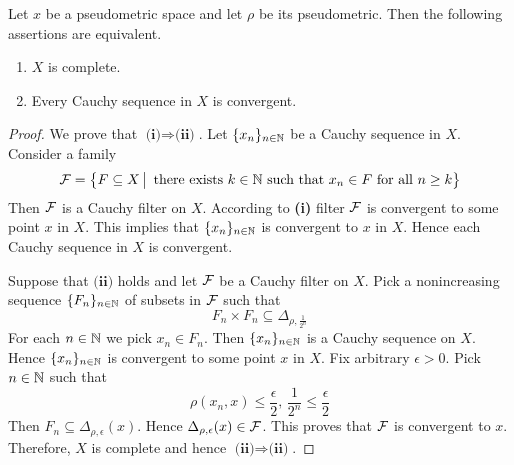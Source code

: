 \begin{theorem}\label{theorem:completeness_for_pseudometric_spaces_is_equivalent_to_convergence_of_Cauchy_sequences}
	Let $x$ be a pseudometric space and let $\rho$ be its pseudometric. Then the following assertions are equivalent.
	\begin{enumerate}[label=\emph{\textbf{(\roman*)}}, leftmargin=3.0em]
		\item $X$ is complete.
		\item Every Cauchy sequence in $X$ is convergent.
	\end{enumerate}
\end{theorem}
\begin{proof}
	We prove that $\textbf{(i)} \Rightarrow \textbf{(ii)}$. Let $\{x_n\}_{n \in {\mathbb N}}$ be a Cauchy sequence in $X$. Consider a family
	$${\mathcal F} = \big\{F\subseteq X\,\big|\,\mbox{ there exists }k\in {\mathbb N}\mbox{ such that }x_n \in F\mbox{ for all }n\geq k\big\}$$
	Then ${\mathcal F}$ is a Cauchy filter on $X$. According to \textbf{(i)} filter ${\mathcal F}$ is convergent to some point $x$ in $X$. This implies that $\{x_n\}_{n \in {\mathbb N}}$ is convergent to $x$ in $X$. Hence each Cauchy sequence in $X$ is convergent.

	Suppose that $\textbf{(ii)}$ holds and let ${\mathcal F}$ be a Cauchy filter on $X$. Pick a nonincreasing sequence $\{F_n\}_{n\in {\mathbb N}}$ of subsets in ${\mathcal F}$ such that
	$$F_n \times F_n \subseteq \Delta_{\rho, \frac{1}{2^n}}$$
	For each $n \in {\mathbb N}$ we pick $x_n \in F_n$. Then $\{x_n\}_{n \in {\mathbb N}}$ is a Cauchy sequence on $X$. Hence $\{x_n\}_{n \in {\mathbb N}}$ is convergent to some point $x$ in $X$. Fix arbitrary $\epsilon > 0$. Pick $n \in {\mathbb N}$ such that
	$$\rho(x_n,x) \leq \frac{\epsilon}{2},\,\frac{1}{2^n} \leq \frac{\epsilon}{2}$$
	Then $F_n \subseteq \Delta_{\rho, \epsilon}(x)$. Hence $\Delta_{\rho, \epsilon}(x) \in {\mathcal F}$. This proves that ${\mathcal F}$ is convergent to $x$. Therefore, $X$ is complete and hence $\textbf{(ii)}\Rightarrow \textbf{(ii)}$.
\end{proof}


